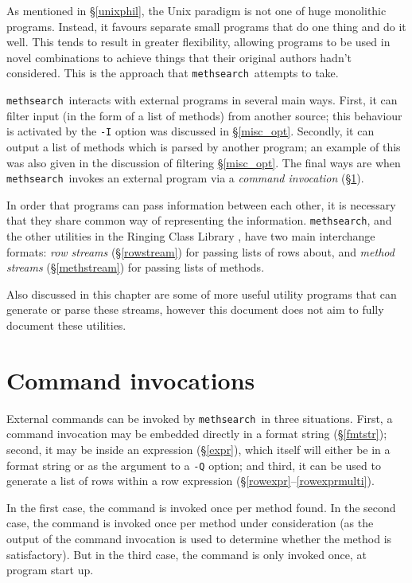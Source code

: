 \documentclass[a4paper,11pt,oneside]{book}
\makeatletter
\newcommand{\oi}[1]{\index{#1@{\hspace*{-\optwidth}\texttt{-}\texttt{#1}}}}
\def\methsearch{\texttt{meth\-search}}
\newcommand{\sref}[1]{\hyperref[#1]{\S\ref{#1}}}
\makeatother
\begin{document}
As mentioned in \sref{unixphil}, the Unix paradigm 
is not one of huge monolithic programs.  Instead, it favours separate
small programs that do one thing and do it well.  This tends to result in
greater flexibility, allowing programs to be used in novel combinations to
achieve things that their original authors hadn't considered.  This is
the approach that \methsearch\ attempts to take.

\methsearch\ interacts with external programs in several main ways.  First, it
can filter input (in the form of a list of methods) from another source;
this behaviour is activated by the \verb+-I+\oi{filter} option was 
discussed in \sref{misc_opt}.  Secondly, it can output a list of methods
which is parsed by another program; an example of this was also given in
the discussion of filtering \sref{misc_opt}.  The final ways are when 
\methsearch\ invokes an external program via a \textit{command invocation}
(\sref{cmdinv}).  

In order that programs can pass information between each other, 
it is necessary that they share common way of representing the information.  
\methsearch, and the other utilities in the Ringing Class Library%
, have two main interchange formats:
\textit{row streams} (\sref{rowstream}) 
for passing lists of rows about, and 
\textit{method streams} (\sref{methstream}) 
for passing lists of methods.%

Also discussed in this chapter are some of more useful utility programs
that can generate or parse these streams, however this document does not
aim to fully document these utilities.

\section{Command invocations}\label{cmdinv}

External commands can be invoked by \methsearch\ in three situations.
First, a command invocation may be embedded directly in a format string
(\sref{fmtstr}); second, it may be inside an expression (\sref{expr}),
which itself will either be in a format string or as the argument to a 
\verb+-Q+\oi{Q} option; and third, it can be used to 
generate a list of rows within a row expression 
(\sref{rowexpr}--\ref{rowexprmulti}).  

In the first case, the command is invoked once per method found.
In the second case, the command is invoked once per method under consideration
(as the output of the command invocation is used to determine whether the
method is satisfactory).  But in the third case, the command is only
invoked once, at program start up.
\end{document}
